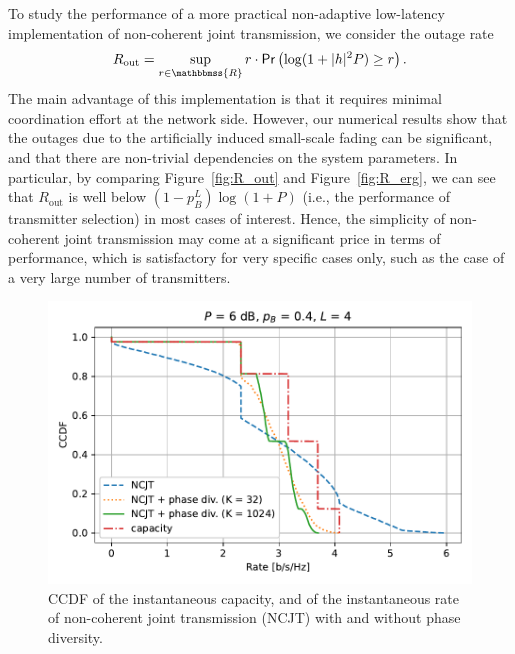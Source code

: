 \documentclass[10pt,journal,a4paper]{IEEEtran}
\renewcommand{\P}{\mathsf{Pr}} 			%
\newcommand{\stdset}[1]{\mathbbmss{#1}}	%
\begin{document}
To study the performance of a more practical non-adaptive low-latency implementation of non-coherent joint transmission, we consider the outage rate
\begin{equation*}
R_{\mathrm{out}} = \sup_{r\in \stdset{R}} r\cdot \P\left(\log(1+|h|^2 P) \geq r\right).
\end{equation*}
The main advantage of this implementation is that it requires minimal coordination effort at the network side. However, our numerical results show that the outages due to the artificially induced small-scale fading can be significant, and that there are non-trivial dependencies on the system parameters. In particular, by comparing Figure~\ref{fig:R_out} and Figure~\ref{fig:R_erg}, we can see that $R_{\mathrm{out}}$ is well below $(1-p_B^L)\log(1+P)$ (i.e., the performance of transmitter selection) in most cases of interest. Hence, the simplicity of non-coherent joint transmission may come at a significant price in terms of performance, which is satisfactory for very specific cases only, such as the case of a very large number of transmitters. 

\begin{figure}[ht!]
\centering
\includegraphics[width=1\linewidth]{ccdf_NCJT_phasediv}
\caption{CCDF of the instantaneous capacity, and of the instantaneous rate of non-coherent joint transmission (NCJT) with and without phase diversity.}
\label{fig:ccdf_NCJT_phasediv}
\end{figure}
\end{document}
